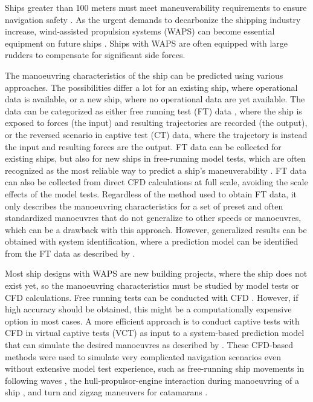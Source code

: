 Ships greater than 100 meters must meet maneuverability requirements to ensure navigation safety \citep{imoStandardsShipManoeuvrability2002}. As the urgent demands to decarbonize the shipping industry increase, wind-assisted propulsion systems (WAPS) can become essential equipment on future ships \citep{nelissenStudyAnalysisMarket2016}. Ships with WAPS are often equipped with large rudders to compensate for significant side forces. 

The manoeuvring characteristics of the ship can be predicted using various approaches. 
The possibilities differ a lot for an existing ship, where operational data is available, or a new ship, where no operational data are yet available. 
The data can be categorized as either free running test (FT) data , where the ship is exposed to forces (the input) and resulting trajectories are recorded (the output), or the reversed scenario in captive test (CT) data, where the trajectory is instead the input and resulting forces are the output.  FT data can be collected for existing ships, but also for new ships in free-running model tests, which are often recognized as the most reliable way to predict a ship's maneuverability \citep{ittcITTCRecommendedProcedures2008}.
FT data can also be collected from direct CFD calculations at full scale, avoiding the scale effects of the model tests. Regardless of the method used to obtain FT data, it only describes the manoeuvring characteristics for a set of preset and often standardized manoeuvres \citep{imoStandardsShipManoeuvrability2002} that do not generalize to other speeds or manoeuvres, which can be a drawback with this approach.
However, generalized results can be obtained with system identification, where a prediction model can be identified from the FT data as described by \citet{luoParameterIdentificationShip2016, xuUncertaintyAnalysisHydrodynamic2019, wangOptimalDesignExcitation2020, alexanderssonSystemIdentificationVessel2022, haoRecurrentNeuralNetworks2022a, kimValidation4DOFManeuvering2024, alexanderssonSystemIdentificationPhysicsinformed2024b}. 

Most ship designs with WAPS are new building projects, where the ship does not exist yet, so the manoeuvring characteristics must be studied by model tests or CFD calculations. Free running tests can be conducted with CFD \citep{sakamotoURANSSimulationsStatic2012,elmoctarRANSBasedSimulatedShip2014,dumanTurnZigzagManoeuvres2022}. However, if high accuracy should be obtained, this might be a computationally expensive option in most cases. A more efficient approach is to conduct captive tests with CFD in virtual captive tests (VCT) as input to a system-based prediction model that can simulate the desired manoeuvres as described by \citet{simonsenKCSPMMTests2014,elmoctarRANSBasedSimulatedShip2014,hajivandVirtualSimulationManeuvering2015,yoonBenchmarkCFDValidation2015c,liuPredictionsShipManeuverability2018}.
 These CFD-based methods were used to simulate very complicated navigation scenarios even without extensive model test experience, such as free-running ship movements in following waves \citep{Araki2019}, the hull-propulsor-engine interaction during manoeuvring of a ship \citep{elmoctarRANSBasedSimulatedShip2014}, and turn and zigzag maneuvers for catamarans \citep{dumanTurnZigzagManoeuvres2022}.

